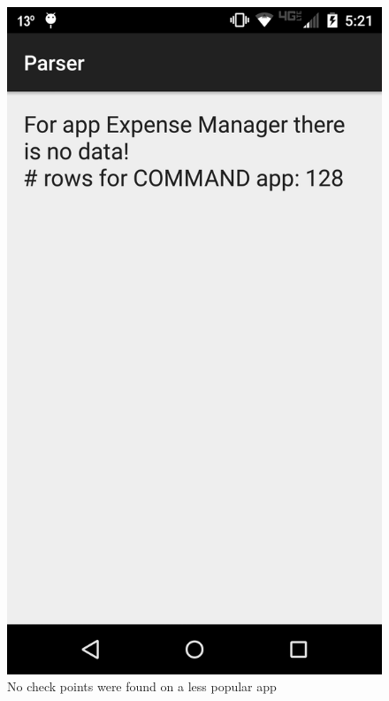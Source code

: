 \begin{figure}[tb]
\centering
	\includegraphics[scale=0.18]{images/nochecks}
	\caption{No check points were found on a less popular app}
	\label{fig:nochecks}
\end{figure}

